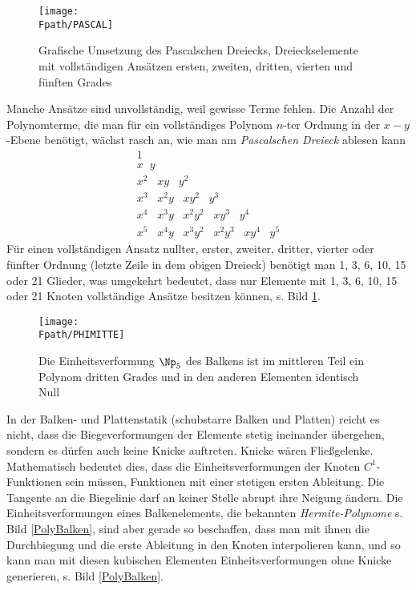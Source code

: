 \begin{figure}[tbp]
\if {} \sidecaption \fi
\texttt{[image: \\Fpath/PASCAL]}
\caption{Grafische Umsetzung des Pascalschen Dreiecks, Dreieckselemente mit
vollst\"{a}ndigen Ans\"{a}tzen ersten, zweiten, dritten, vierten und f\"{u}nften Grades}
\label{BildPascal}
\end{figure}%
Manche Ans\"{a}tze sind unvollst\"{a}ndig, weil gewisse Terme fehlen. Die Anzahl der
Polynomterme, die man f\"{u}r ein vollst\"{a}ndiges Polynom $n$-ter Ordnung in der $x-y$-Ebene
ben\"{o}tigt, w\"{a}chst rasch an, wie man am {\em Pascalschen Dreieck\/} ablesen kann
\begin{eqnarray*}
& 1 &\\
& x\;\;y &\\
& x^2\;\;\; xy\;\;\; y^2\;\;\; &\\
& x^3\;\;\; x^2y\;\;\; xy^2\;\;\; y^3 & \\
& x^4\;\;\; x^3y\;\;\; x^2y^2\;\;\; xy^3\;\;\; y^4 &\\
& x^5\;\;\; x^4y\;\;\; x^3y^2\;\;\;x^2y^3\;\;\; xy^4\;\;\; y^5 &
\end{eqnarray*}
F\"{u}r einen vollst\"{a}ndigen Ansatz nullter, erster, zweiter, dritter, vierter oder f\"{u}nfter
Ordnung (letzte Zeile in dem obigen Dreieck) ben\"{o}tigt man 1, 3, 6, 10, 15 oder 21
Glieder, was umgekehrt bedeutet, dass nur Elemente mit 1, 3, 6, 10, 15 oder 21 Knoten
vollst\"{a}ndige Ans\"{a}tze besitzen k\"{o}nnen, s. Bild \ref{BildPascal}.
\begin{figure}[tbp]
\if {} \sidecaption \fi
\texttt{[image: \\Fpath/PHIMITTE]}
\caption{Die Einheitsverformung $\Np_5$ des Balkens ist im mittleren Teil ein Polynom
dritten Grades und in den anderen Elementen identisch Null} \label{PhiMitte}
\end{figure}%

In der Balken- und Plattenstatik (schubstarre Balken und Platten) reicht es nicht, dass
die Biegeverformungen der Elemente stetig ineinander \"{u}bergehen, sondern es d\"{u}rfen auch
keine Knicke auftreten. Knicke w\"{a}ren Flie{\ss}gelenke. Mathematisch bedeutet dies, dass die
Einheitsverformungen der Knoten $C^1$-Funktionen sein m\"{u}ssen, Funktionen mit einer
stetigen ersten Ableitung. Die Tangente an die Biegelinie darf an keiner Stelle abrupt
ihre Neigung \"{a}ndern. Die Einheitsverformungen eines Balkenelements, die bekannten {\em
Hermite-Polynome\/}   s. Bild \ref{PolyBalken}, sind aber gerade
so beschaffen, dass man mit ihnen die Durchbiegung und die erste Ableitung in den Knoten
interpolieren kann, und so kann man mit diesen kubischen Elementen Einheitsverformungen
ohne Knicke generieren, s. Bild \ref{PolyBalken}.

